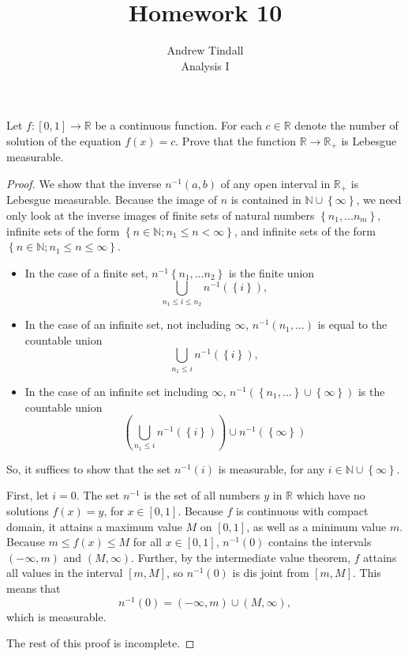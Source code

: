 \documentclass[12pt]{article}
\newcommand{\N}{\mathbb{N}}
\newcommand{\R}{\mathbb{R}}
\theoremstyle{definition}
\newenvironment{problem}[2][Problem]{\begin{trivlist}
\item[\hskip \labelsep {\bfseries #1}\hskip \labelsep {\bfseries #2.}]}{\end{trivlist}}
\begin{document}
 
 
\title{Homework 10}
\author{Andrew Tindall\\
Analysis I}
 
\maketitle
\begin{problem}{1}
	Let $f: [0,1] \to \R$ be a continuous function. For each $c \in \R$ denote the number of solution of the equation $f(x) = c$. Prove that the function $\R \to \R_+$ is Lebesgue measurable.
	\begin{proof}
		We show that the inverse $n^{-1}(a,b)$ of any open interval in $\R_+$ is Lebesgue measurable. Because the image of $n$ is contained in $\N \cup \left\{ \infty \right\}$, we need only look at the inverse images of finite sets of natural numbers $\left\{ n_1, \dots n_m \right\}$, infinite sets of the form $\left\{ n \in \N; n_1 \leq n < \infty \right\}$, and infinite sets of the form $\left\{ n \in \N; n_1 \leq n \leq \infty \right\}$.
		\begin{itemize}
			\item In the case of a finite set, $n^{-1}\left\{ n_1, \dots n_2 \right\}$ is the finite union
				\[ \bigcup_{n_1 \leq i \leq n_2} n^{-1}(\left\{ i \right\}),\]
			\item In the case of an infinite set, not including $\infty$, $n^{-1}({n_1, \dots })$ is equal to the countable union
				\[\bigcup_{n_1 \leq i} n^{-1}(\left\{ i \right\}),\]
			\item In the case of an infinite set including $\infty$, $n^{-1}\left( \left\{ n_1, \dots \right\} \cup \left\{ \infty \right\} \right)$ is the countable union
				\[\left( \bigcup_{n_1 \leq i} n^{-1}(\left\{ i \right\}) \right) \cup n^{-1}(\left\{ \infty \right\})\]
		\end{itemize}
		So, it suffices to show that the set $n^{-1}(i)$ is measurable, for any $i \in \N\cup \left\{ \infty \right\} $.
		\par First, let $i = 0$. The set $n^{-1}$ is the set of all numbers $y$ in $\R$ which have no solutions $f(x) = y$, for $x \in [0,1]$. Because $f$ is continuous with compact domain, it attains a maximum value $M$ on $[0,1]$, as well as a minimum value $m$. Because $m \leq f(x) \leq M$ for all $ x \in [0,1]$, $n^{-1}(0)$ contains the intervals $(-\infty, m)$ and $(M, \infty)$. Further, by the intermediate value theorem, $f$ attains all values in the interval $[m, M]$, so $n^{-1}(0)$ is dis joint from $[m, M]$. This means that 
		\[n^{-1}(0) = (-\infty, m) \cup (M, \infty),\]
		which is measurable.
		\par \;\par The rest of this proof is incomplete.
	\end{proof}
\end{problem}
\end{document}
